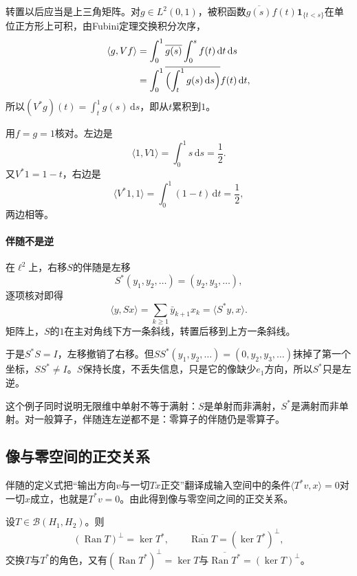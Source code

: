 转置以后应当是上三角矩阵。对$g\in L^2(0,1)$，被积函数$\overline{g(s)}f(t)\mathbf 1_{\{t<s\}}$在单位正方形上可积，由Fubini定理交换积分次序，
\[
 \begin{aligned}
 \langle g,Vf\rangle
 &=\int_0^1\overline{g(s)}\int_0^sf(t)\,\mathrm dt\,\mathrm ds\\
 &=\int_0^1\overline{\Bigl(\int_t^1g(s)\,\mathrm ds\Bigr)}f(t)\,\mathrm dt ,
 \end{aligned}
\]
所以$(V^*g)(t)=\int_t^1g(s)\,\mathrm ds$，即从$t$累积到$1$。

用$f=g=1$核对。左边是
\[
 \langle1,V1\rangle=\int_0^1s\,\mathrm ds=\frac12.
\]
又$V^*1=1-t$，右边是
\[
 \langle V^*1,1\rangle=\int_0^1(1-t)\,\mathrm dt=\frac12,
\]
两边相等。

\paragraph{伴随不是逆}
在$\ell^2$上，右移$S$的伴随是左移
\[
 S^*(y_1,y_2,\ldots)=(y_2,y_3,\ldots),
\]
逐项核对即得
\[
 \langle y,Sx\rangle=\sum_{k\geq1}\bar y_{k+1}x_k=\langle S^*y,x\rangle.
\]
矩阵上，$S$的$1$在主对角线下方一条斜线，转置后移到上方一条斜线。

于是$S^*S=I$，左移撤销了右移。但$SS^*(y_1,y_2,\ldots)=(0,y_2,y_3,\ldots)$抹掉了第一个坐标，$SS^*\neq I$。$S$保持长度，不丢失信息，只是它的像缺少$e_1$方向，所以$S^*$只是左逆。

这个例子同时说明无限维中单射不等于满射：$S$是单射而非满射，$S^*$是满射而非单射。对一般算子，伴随连左逆都不是：零算子的伴随仍是零算子。

\subsection{像与零空间的正交关系}
\label{sec:lop-range-kernel}

伴随的定义式把“输出方向$v$与一切$Tx$正交”翻译成输入空间中的条件$\langle T^*v,x\rangle=0$对一切$x$成立，也就是$T^*v=0$。由此得到像与零空间之间的正交关系。

\begin{theorem}[像与零空间的正交关系]
\label{thm:lop-range-kernel}
设$T\in\mathcal B(H_1,H_2)$。则
\begin{equation}
 (\operatorname{Ran}T)^\perp=\ker T^*,\qquad\overline{\operatorname{Ran}T}=(\ker T^*)^\perp ,
 \label{eq:lop-range-kernel}
\end{equation}
交换$T$与$T^*$的角色，又有$(\operatorname{Ran}T^*)^\perp=\ker T$与$\overline{\operatorname{Ran}T^*}=(\ker T)^\perp$。
\end{theorem}

